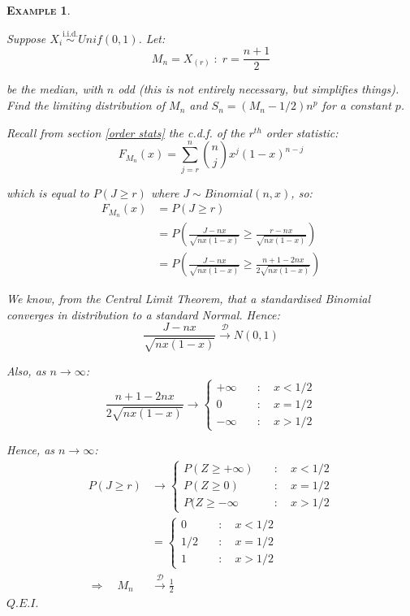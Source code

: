 \documentclass[12pt,a4paper]{article}
\newtheorem{example}{\textsc{Example}}[section]
\begin{document}
\begin{example}$\;$\par\vspace{1cm}

Suppose $X_i \overset{\text{i.i.d.}}{\sim} Unif(0,1)$. Let:
$$M_n = X_{(r)}\; :\; r=\frac{n+1}{2}$$

be the median, with $n$ odd (this is not entirely necessary, but simplifies things). Find the limiting distribution of $M_n$ and $S_n = (M_n - 1/2)n^p$ for a constant $p$.\par\vspace{1cm}

Recall from section \ref{order stats} the c.d.f. of the $r^{th}$ order statistic:
$$F_{M_n}(x) = \sum_{j=r}^n \binom{n}{j}x^j (1-x)^{n-j}$$

which is equal to $P(J\geq r)$ where $J\sim Binomial(n,x)$, so:
\begin{align*}
F_{M_n}(x) &= P(J\geq r)\\
&= P\left(\frac{J-nx}{\sqrt{nx(1-x)}} \geq \frac{r-nx}{\sqrt{nx(1-x)}}\right)\\
&= P\left(\frac{J-nx}{\sqrt{nx(1-x)}} \geq \frac{n+1-2nx}{2\sqrt{nx(1-x)}}\right)
\end{align*}

We know, from the Central Limit Theorem, that a standardised Binomial converges in distribution to a standard Normal. Hence:
$$\frac{J-nx}{\sqrt{nx(1-x)}} \xrightarrow{\mathscr{D}} N(0,1)$$

Also, as $n\to\infty$:
$$\frac{n+1-2nx}{2\sqrt{nx(1-x)}} \rightarrow \left\{\begin{array}{cc} +\infty \quad&:\quad x<1/2\\ 0\quad&:\quad x=1/2\\-\infty\quad&:\quad x>1/2\end{array}\right.$$

Hence, as $n\to\infty$:
\begin{align*}
P(J\geq r) &\to \left\{\begin{array}{cc} P(Z\geq +\infty)\quad&:\quad x<1/2\\ P(Z \geq 0)\quad&:\quad x=1/2\\ P(Z\geq -\infty\quad&:\quad x>1/2\end{array}\right.\\
&= \left\{\begin{array}{cc} 0\quad&:\quad x<1/2\\ 1/2\quad&:\quad x=1/2\\ 1\quad&:\quad x>1/2\end{array}\right.\\
\Rightarrow\quad M_n &\xrightarrow{\mathscr{D}} \frac{1}{2}
\end{align*}\hfill$Q.E.I.$


\end{example}
\end{document}
